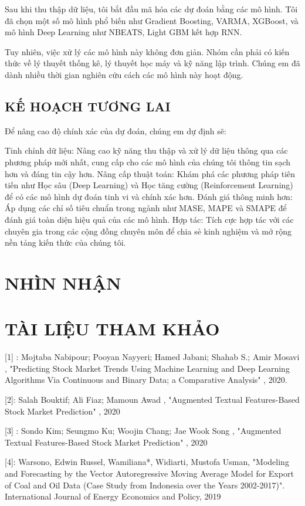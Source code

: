 \documentclass[conference]{IEEEtran}
\begin{document}
Sau khi thu thập dữ liệu, tôi bắt đầu mã hóa các dự đoán bằng các mô hình. Tôi đã chọn một số mô hình phổ biến như Gradient Boosting, VARMA, XGBoost, và mô hình Deep Learning như NBEATS,  Light GBM kết hợp RNN. 

Tuy nhiên, việc xử lý các mô hình này không đơn giản. Nhóm cần phải có kiến thức về lý thuyết thống kê, lý thuyết học máy và kỹ năng lập trình. Chúng em đã dành nhiều thời gian nghiên cứu cách các mô hình này hoạt động.

\subsection{KẾ HOẠCH TƯƠNG LAI }

Để nâng cao độ chính xác của dự đoán, chúng em dự định sẽ:

Tinh chỉnh dữ liệu: Nâng cao kỹ năng thu thập và xử lý dữ liệu thông qua các phương pháp mới nhất, cung cấp cho các mô hình của chúng tôi thông tin sạch hơn và đáng tin cậy hơn.
Nâng cấp thuật toán: Khám phá các phương pháp tiên tiến như Học sâu (Deep Learning) và Học tăng cường (Reinforcement Learning) để có các mô hình dự đoán tinh vi và chính xác hơn.
Đánh giá thông minh hơn: Áp dụng các chỉ số tiêu chuẩn trong ngành như MASE, MAPE và SMAPE để đánh giá toàn diện hiệu quả của các mô hình.
Hợp tác: Tích cực hợp tác với các chuyên gia trong các cộng đồng chuyên môn để chia sẻ kinh nghiệm và mở rộng nền tảng kiến thức của chúng tôi.

\section*{NHÌN NHẬN  }


\section*{TÀI LIỆU THAM KHẢO}


[1] : Mojtaba Nabipour; Pooyan Nayyeri; Hamed Jabani; Shahab S.; Amir Mosavi , "Predicting Stock Market Trends Using Machine Learning and Deep Learning Algorithms Via Continuous and Binary Data; a Comparative Analysis" , 2020. 

[2]: Salah Bouktif; Ali Fiaz; Mamoun Awad , "Augmented Textual Features-Based Stock Market Prediction" , 2020 

[3] : Sondo Kim; Seungmo Ku; Woojin Chang; Jae Wook Song , "Augmented Textual Features-Based Stock Market Prediction" , 2020 


[4]: Warsono, Edwin Russel, Wamiliana*, Widiarti, Mustofa Usman, "Modeling and Forecasting by the Vector Autoregressive Moving Average Model for Export of Coal and Oil Data (Case Study from Indonesia over the Years 2002-2017)". International Journal of Energy Economics and Policy, 2019
\end{document}
